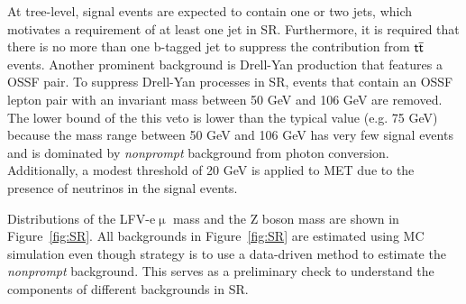At tree-level, signal events are expected to contain one or two jets, which motivates a requirement of at least one jet in \ac{SR}. Furthermore, it is required that there is no more than one b-tagged jet to suppress the contribution from $\textsf{t}\overline{\textsf{t}}$ events. Another prominent background is Drell-Yan production that features a \ac{OSSF} pair. To suppress Drell-Yan processes in \ac{SR}, events that contain an \ac{OSSF} lepton pair with an invariant mass between 50 GeV and 106 GeV are removed. The lower bound of the this veto is lower than the typical value (e.g. 75 GeV) because the mass range between 50 GeV and 106 GeV has very few signal events and is dominated by \emph{nonprompt} background from photon conversion. Additionally, a modest threshold of 20 GeV is applied to \ac{MET} due to the presence of neutrinos in the signal events.

Distributions of the LFV-e$\upmu$ mass and the Z boson mass are shown in Figure~\ref{fig:SR}. All backgrounds in Figure~\ref{fig:SR} are estimated using MC simulation even though strategy is to use a data-driven method to estimate the \emph{nonprompt} background. This serves as a preliminary check to understand the components of different backgrounds in \ac{SR}. 

